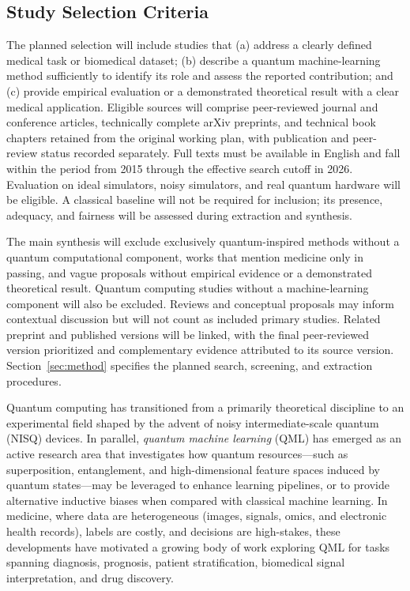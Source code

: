 \documentclass[pdflatex,bst/sn-mathphys-num]{sn-jnl}
\begin{document}
\subsection{Study Selection Criteria}\label{sec:selection}

The planned selection will include studies that (a) address a clearly defined medical task or biomedical dataset; (b) describe a quantum machine-learning method sufficiently to identify its role and assess the reported contribution; and (c) provide empirical evaluation or a demonstrated theoretical result with a clear medical application. Eligible sources will comprise peer-reviewed journal and conference articles, technically complete arXiv preprints, and technical book chapters retained from the original working plan, with publication and peer-review status recorded separately. Full texts must be available in English and fall within the period from 2015 through the effective search cutoff in 2026. Evaluation on ideal simulators, noisy simulators, and real quantum hardware will be eligible. A classical baseline will not be required for inclusion; its presence, adequacy, and fairness will be assessed during extraction and synthesis.

The main synthesis will exclude exclusively quantum-inspired methods without a quantum computational component, works that mention medicine only in passing, and vague proposals without empirical evidence or a demonstrated theoretical result. Quantum computing studies without a machine-learning component will also be excluded. Reviews and conceptual proposals may inform contextual discussion but will not count as included primary studies. Related preprint and published versions will be linked, with the final peer-reviewed version prioritized and complementary evidence attributed to its source version. Section~\ref{sec:method} specifies the planned search, screening, and extraction procedures.

Quantum computing has transitioned from a primarily theoretical discipline to an experimental field shaped by the advent of noisy intermediate-scale quantum (NISQ) devices. In parallel, \emph{quantum machine learning} (QML) has emerged as an active research area that investigates how quantum resources---such as superposition, entanglement, and high-dimensional feature spaces induced by quantum states---may be leveraged to enhance learning pipelines, or to provide alternative inductive biases when compared with classical machine learning. In medicine, where data are heterogeneous (images, signals, omics, and electronic health records), labels are costly, and decisions are high-stakes, these developments have motivated a growing body of work exploring QML for tasks spanning diagnosis, prognosis, patient stratification, biomedical signal interpretation, and drug discovery.
\end{document}
